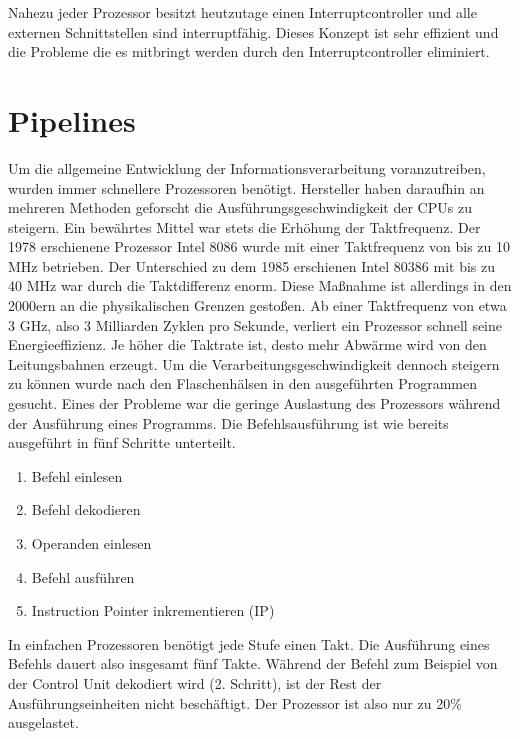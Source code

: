 \documentclass[12pt]{article}
\begin{document}
\par\smallskip\noindent Nahezu jeder Prozessor besitzt heutzutage einen Interruptcontroller und alle externen Schnittstellen sind interruptfähig. Dieses Konzept ist sehr effizient und die Probleme die es mitbringt werden durch den Interruptcontroller eliminiert.

\newpage
\section{Pipelines}
Um die allgemeine Entwicklung der Informationsverarbeitung voranzutreiben, wurden immer schnellere Prozessoren benötigt. Hersteller haben daraufhin an mehreren Methoden geforscht die Ausführungsgeschwindigkeit der CPUs zu steigern. Ein bewährtes Mittel war stets die Erhöhung der Taktfrequenz. Der 1978 erschienene Prozessor Intel 8086 wurde mit einer Taktfrequenz von bis zu 10 MHz betrieben. Der Unterschied zu dem 1985 erschienen Intel 80386 mit bis zu 40 MHz war durch die Taktdifferenz enorm. Diese Maßnahme ist allerdings in den 2000ern an die physikalischen Grenzen gestoßen. Ab einer Taktfrequenz von etwa 3 GHz, also 3 Milliarden Zyklen pro Sekunde, verliert ein Prozessor schnell seine Energieeffizienz. Je höher die Taktrate ist, desto mehr Abwärme wird von den Leitungsbahnen erzeugt.
Um die Verarbeitungsgeschwindigkeit dennoch steigern zu können wurde nach den Flaschenhälsen in den ausgeführten Programmen gesucht. Eines der  Probleme war die geringe Auslastung des Prozessors während der Ausführung eines Programms. Die Befehlsausführung ist wie bereits ausgeführt in fünf Schritte unterteilt.
\begin{enumerate}
\item Befehl einlesen
\item Befehl dekodieren
\item Operanden einlesen
\item Befehl ausführen 
\item Instruction Pointer inkrementieren (IP)
\end{enumerate}
In einfachen Prozessoren benötigt jede Stufe einen Takt. Die Ausführung eines Befehls dauert also insgesamt fünf Takte. Während der Befehl zum Beispiel von der Control Unit dekodiert wird (2. Schritt), ist der Rest der Ausführungseinheiten nicht beschäftigt. Der Prozessor ist also nur zu 20\% ausgelastet. 
\end{document}

